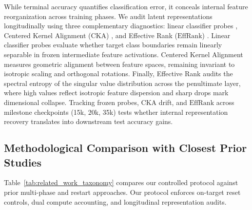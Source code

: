 \documentclass[sn-mathphys,Numbered]{sn-jnl}
\newcommand{\EffRank}{\mathrm{EffRank}}
\begin{document}
While terminal accuracy quantifies classification error, it conceals internal feature reorganization across training phases. We audit latent representations longitudinally using three complementary diagnostics: linear classifier probes \cite{alain2017understanding,belinkov2022probing}, Centered Kernel Alignment (CKA) \cite{kornblith2019similarity}, and Effective Rank ($\EffRank$) \cite{roy2007effective,manna2026projector,begga2026preserving}. Linear classifier probes evaluate whether target class boundaries remain linearly separable in frozen intermediate feature activations. Centered Kernel Alignment measures geometric alignment between feature spaces, remaining invariant to isotropic scaling and orthogonal rotations. Finally, Effective Rank audits the spectral entropy of the singular value distribution across the penultimate layer, where high values reflect isotropic feature dispersion and sharp drops mark dimensional collapse. Tracking frozen probes, CKA drift, and $\EffRank$ across milestone checkpoints (15k, 20k, 35k) tests whether internal representation recovery translates into downstream test accuracy gains.

\subsection{Methodological Comparison with Closest Prior Studies}\label{subsec:related_comparison}\label{subsec:related_taxonomy}

Table~\ref{tab:related_work_taxonomy} compares our controlled protocol against prior multi-phase and restart approaches. Our protocol enforces on-target reset controls, dual compute accounting, and longitudinal representation audits.
\end{document}
